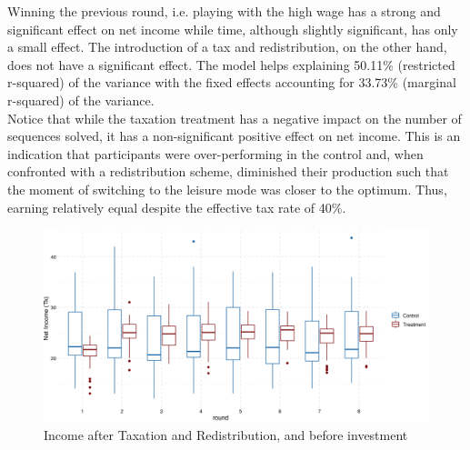Winning the previous round, i.e. playing with the high wage has a strong and significant effect on net income while time, although slightly significant, has only a small effect. The introduction of a tax and redistribution, on the other hand, does not have a significant effect. The model helps explaining 50.11\% (restricted r-squared) of the variance with the fixed effects accounting for 33.73\% (marginal r-squared) of the variance.\\

Notice that while the taxation treatment has a negative impact on the number of sequences solved, it has a non-significant positive effect on net income. This is an indication that participants were over-performing in the control and, when confronted with a redistribution scheme, diminished their production such that the moment of switching to the leisure mode was closer to the optimum. Thus, earning relatively equal despite the effective tax rate of 40\%.\\

\begin{figure}
    \centering
    \includegraphics[width=\textwidth]{graphs/earnings_boxplot.png}
    \caption{Income after Taxation and Redistribution, and before investment}
    \label{fig:earnings_boxplot}
\end{figure}


